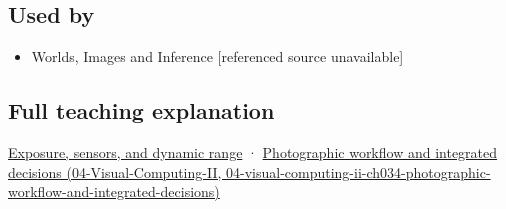 \subsection{Used by}\label{appendix-92d45cdf2afc-used-by}

\begin{itemize}
\tightlist
\item
  {Worlds, Images and Inference {[}referenced source unavailable{]}}
\end{itemize}

\subsection{Full teaching explanation}\label{appendix-92d45cdf2afc-full-teaching-explanation}

\hyperref[03-visual-computing-i-ch003-exposure-sensors-and-dynamic-range]{Exposure, sensors, and dynamic range} · \href{../04-Visual-Computing-II/main.pdf\#nameddest=04-visual-computing-ii-ch034-photographic-workflow-and-integrated-decisions}{Photographic workflow and integrated decisions (04-Visual-Computing-II, 04-visual-computing-ii-ch034-photographic-workflow-and-integrated-decisions)}

